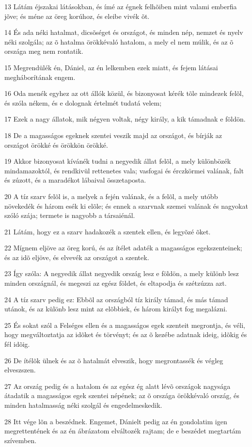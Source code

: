 \par 13 Látám éjszakai látásokban, és ímé az égnek felhõiben mint valami emberfia jõve; és méne az öreg korúhoz, és eleibe vivék õt.
\par 14 És ada néki hatalmat, dicsõséget és országot, és minden nép, nemzet és nyelv néki szolgála; az õ hatalma örökkévaló hatalom, a mely el nem múlik, és az õ országa meg nem rontatik.
\par 15 Megrendülék én, Dániel, az én lelkemben ezek miatt, és fejem látásai megháborítának engem.
\par 16 Oda menék egyhez az ott állók közül, és bizonyosat kérék tõle mindezek felõl, és szóla nékem, és e dolognak értelmét tudatá velem;
\par 17 Ezek a nagy állatok, mik négyen voltak, négy király, a kik támadnak e földön.
\par 18 De a magasságos egeknek szentei veszik majd az országot, és bírják az országot örökké és örökkön örökké.
\par 19 Akkor bizonyosat kívánék tudni a negyedik állat felõl, a mely különbözék mindamazoktól, és rendkivül rettenetes vala; vasfogai és érczkörmei valának, falt és zúzott, és a maradékot lábaival összetaposta.
\par 20 A tíz szarv felõl is, a melyek a fején valának, és a felõl, a mely utóbb növekedék és három esék ki elõle; és ennek a szarvnak szemei valának és nagyokat szóló szája; termete is nagyobb a társaiénál.
\par 21 Látám, hogy ez a szarv hadakozék a szentek ellen, és legyõzé õket.
\par 22 Mígnem eljöve az öreg korú, és az ítélet adaték a magasságos  egekszenteinek; és az idõ eljöve, és elvevék az országot a szentek.
\par 23 Így szóla: A negyedik állat negyedik ország lesz e földön, a mely különb lesz minden országnál, és megeszi az egész földet, és eltapodja és szétzúzza azt.
\par 24 A tíz szarv pedig ez: Ebbõl az országból tíz király támad, és más támad utánok, és az különb lesz mint az elõbbiek, és három királyt fog megalázni.
\par 25 És sokat szól a Felséges ellen és a magasságos egek szenteit megrontja, és véli, hogy megváltoztatja az idõket és törvényt; és az õ  kezébe adatnak ideig, idõkig és fél idõig.
\par 26 De ítélõk ülnek és az õ hatalmát elveszik, hogy megrontassék és végleg elveszszen.
\par 27 Az ország pedig és a hatalom és az egész ég alatt lévõ országok nagysága átadatik a magasságos egek szentei népének; az õ országa örökkévaló ország, és minden hatalmasság néki szolgál és engedelmeskedik.
\par 28 Itt vége lõn a beszédnek. Engemet, Dánielt pedig az én gondolatim igen megrettentének és az én ábrázatom elváltozék rajtam; de e beszédet megtartám szívemben.

